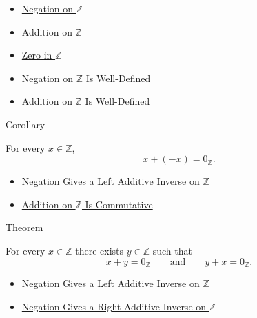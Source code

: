 \begin{dependencies}
\begin{itemize}
  \item \hyperref[def:negation-on-z-classes]{Negation on $\mathbb{Z}$}
  \item \hyperref[def:addition-on-z-classes]{Addition on $\mathbb{Z}$}
  \item \hyperref[def:zero-in-z]{Zero in $\mathbb{Z}$}
  \item \hyperref[thm:negation-on-z-well-defined]{Negation on $\mathbb{Z}$ Is Well-Defined}
  \item \hyperref[thm:addition-on-z-well-defined]{Addition on $\mathbb{Z}$ Is Well-Defined}
\end{itemize}
\end{dependencies}

\begin{corollarybox}{Corollary}
\begin{corollary}
\label{cor:negation-right-additive-inverse-on-z}
For every $x\in\mathbb{Z}$,
\[
x+(-x)=0_{\mathbb{Z}}.
\]
\end{corollary}
\end{corollarybox}

\begin{dependencies}
\begin{itemize}
  \item \hyperref[thm:negation-left-additive-inverse-on-z]{Negation Gives a Left Additive Inverse on $\mathbb{Z}$}
  \item \hyperref[thm:addition-on-z-commutative]{Addition on $\mathbb{Z}$ Is Commutative}
\end{itemize}
\end{dependencies}

\begin{theorembox}{Theorem}
\begin{theorem}
\label{thm:every-integer-has-additive-inverse}
For every $x\in\mathbb{Z}$ there exists $y\in\mathbb{Z}$ such that
\[
x+y=0_{\mathbb{Z}}
\qquad\text{and}\qquad
y+x=0_{\mathbb{Z}}.
\]
\end{theorem}
\end{theorembox}

\begin{dependencies}
\begin{itemize}
  \item \hyperref[thm:negation-left-additive-inverse-on-z]{Negation Gives a Left Additive Inverse on $\mathbb{Z}$}
  \item \hyperref[cor:negation-right-additive-inverse-on-z]{Negation Gives a Right Additive Inverse on $\mathbb{Z}$}
\end{itemize}
\end{dependencies}

